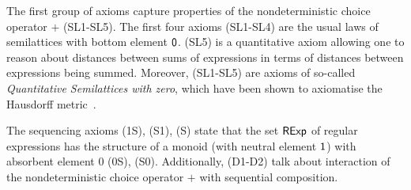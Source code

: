 The first group of axioms capture properties of the nondeterministic choice operator $+$ \textsf{(SL1-SL5)}. The first four axioms \textsf{(SL1-SL4)} are the usual laws of semilattices with bottom element $\mathsf{0}$. (\textsf{SL5}) is a quantitative axiom allowing one to reason about distances between sums of expressions in terms of distances between expressions being summed. Moreover, \textsf{(SL1-SL5)} are axioms of so-called \emph{Quantitative Semilattices with zero}, which have been shown to axiomatise the Hausdorff metric~\cite{Mardare:2016:Quantitative}. 

The sequencing axioms \textsf{(1S), (S1), (S)} state that the set $\mathsf{RExp}$ of regular expressions has the structure of a monoid (with neutral element $\mathsf{1}$) with absorbent element $0$ \textsf{(0S), (S0)}. Additionally, \textsf{(D1-D2)} talk about interaction of the nondeterministic choice operator $+$ with sequential composition. 

